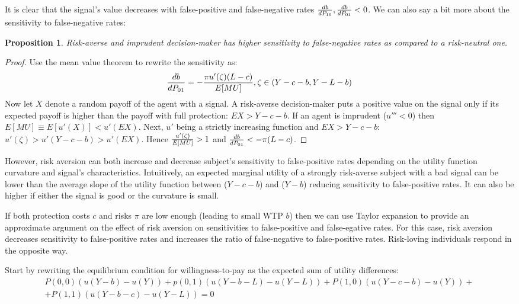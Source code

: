 \documentclass[12pt,a4paper]{article}
\newtheorem{theorem}{Proposition}
\begin{document}
It is clear that the signal's value decreases with false-positive and false-negative rates ${db\over dP_{10}},{db\over dP_{01}}<0$. We can also say a bit more about the sensitivity to false-negative rates:
\begin{theorem}
Risk-averse and imprudent decision-maker has higher sensitivity to false-negative rates as compared to a risk-neutral one.
\end{theorem}\label{thm:riskAverse}  
\begin{proof}
Use the mean value theorem to rewrite the sensitivity as:
$${db\over dP_{01}}=-{\pi u'(\zeta)(L-c)\over E[MU]},\zeta \in \left(Y-c-b, Y-L-b\right)$$
Now let $X$ denote a random payoff of the agent with a signal. A risk-averse decision-maker puts a positive value on the signal only if its expected payoff is higher than the payoff with full protection: $EX>Y-c-b$. If an agent is imprudent ($u'''<0$) then $E[MU]\equiv E[u'(X)]<u'(EX)$. Next, $u'$ being a strictly increasing function and $EX>Y-c-b$: $u'(\zeta)>u'(Y-c-b)>u'(EX)$. Hence ${u'(\zeta)\over E[MU]}>1$ and ${db\over dP_{01}}<-\pi(L-c)$. 
\end{proof}

However, risk aversion can both increase and decrease subject's sensitivity to false-positive rates depending on the utility function curvature and signal's characteristics. Intuitively, an expected marginal utility of a strongly risk-averse subject with a bad signal can be lower than the average slope of the utility function between ($Y-c-b$) and ($Y-b$) reducing sensitivity to false-positive rates. It can also be higher if either the signal is good or the curvature is small. 

If both protection costs $c$ and risks $\pi$ are low enough (leading to small WTP $b$) then we can use Taylor expansion to provide an approximate argument on the effect of risk aversion on sensitivities to false-positive and false-egative rates. For this case, risk aversion decreases sensitivity to false-positive rates and increases the ratio of false-negative to false-positive rates. Risk-loving individuals respond in the opposite way.

Start by rewriting the equilibrium condition for willingness-to-pay as the expected sum of utility differences:
\begin{equation}
\begin{split}
P(0,0) (u(Y-b)-u(Y))+p(0,1)(u(Y-b-L)-u(Y-L))+P(1,0)(u(Y-c-b)-u(Y))+\\+P(1,1)(u(Y-b-c)-u(Y-L))=0
\end{split}
\end{equation}
\end{document}
